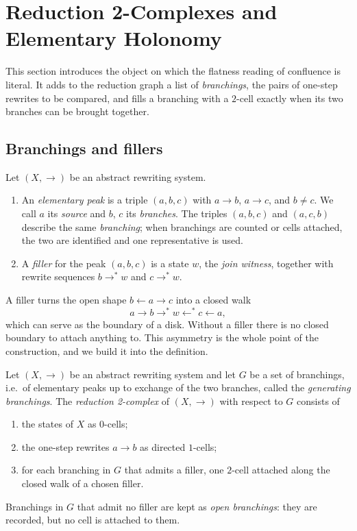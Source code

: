 \section{Reduction 2-Complexes and Elementary Holonomy}
\label{sec:reduction-two-complex}

This section introduces the object on which the flatness reading of confluence is literal. It adds to the reduction graph a list of \emph{branchings}, the pairs of one-step rewrites to be compared, and fills a branching with a $2$-cell exactly when its two branches can be brought together.

\subsection{Branchings and fillers}

\begin{definition}
\label{def:elementary-peak-flatness}
\label{def:boundary-filler-data}
Let $(X,\to)$ be an abstract rewriting system.
\begin{enumerate}
    \item An \emph{elementary peak} is a triple $(a,b,c)$ with $a \to b$, $a \to c$, and $b \neq c$. We call $a$ its \emph{source} and $b$, $c$ its \emph{branches}. The triples $(a,b,c)$ and $(a,c,b)$ describe the same \emph{branching}; when branchings are counted or cells attached, the two are identified and one representative is used.
    \item A \emph{filler} for the peak $(a,b,c)$ is a state $w$, the \emph{join witness}, together with rewrite sequences $b \to^{*} w$ and $c \to^{*} w$.
\end{enumerate}
\end{definition}

A filler turns the open shape $b \leftarrow a \to c$ into a closed walk
\[
a \to b \to^{*} w \leftarrow^{*} c \leftarrow a,
\]
which can serve as the boundary of a disk. Without a filler there is no closed boundary to attach anything to. This asymmetry is the whole point of the construction, and we build it into the definition.

\begin{definition}
\label{def:reduction-two-complex}
Let $(X,\to)$ be an abstract rewriting system and let $G$ be a set of branchings, i.e.\ of elementary peaks up to exchange of the two branches, called the \emph{generating branchings}. The \emph{reduction 2-complex} of $(X,\to)$ with respect to $G$ consists of
\begin{enumerate}
    \item the states of $X$ as $0$-cells;
    \item the one-step rewrites $a \to b$ as directed $1$-cells;
    \item for each branching in $G$ that admits a filler, one $2$-cell attached along the closed walk of a chosen filler.
\end{enumerate}
Branchings in $G$ that admit no filler are kept as \emph{open branchings}: they are recorded, but no cell is attached to them.
\end{definition}

